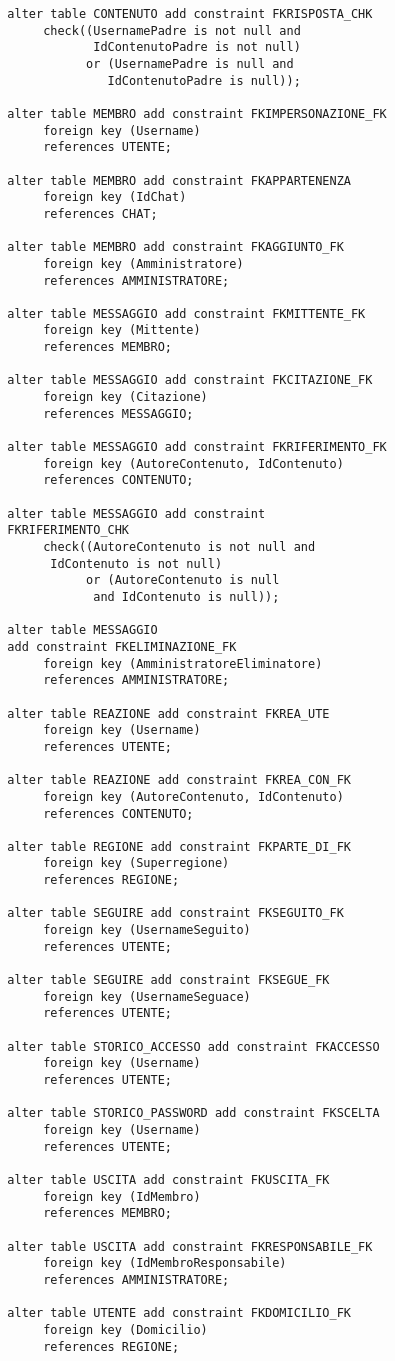 \documentclass[a4paper,12pt]{report}
\begin{document}
\begin{lstlisting}
  alter table CONTENUTO add constraint FKRISPOSTA_CHK
       check((UsernamePadre is not null and 
              IdContenutoPadre is not null)
             or (UsernamePadre is null and
                IdContenutoPadre is null)); 
  
  alter table MEMBRO add constraint FKIMPERSONAZIONE_FK
       foreign key (Username)
       references UTENTE;
  
  alter table MEMBRO add constraint FKAPPARTENENZA
       foreign key (IdChat)
       references CHAT;
  
  alter table MEMBRO add constraint FKAGGIUNTO_FK
       foreign key (Amministratore)
       references AMMINISTRATORE;
  
  alter table MESSAGGIO add constraint FKMITTENTE_FK
       foreign key (Mittente)
       references MEMBRO;
  
  alter table MESSAGGIO add constraint FKCITAZIONE_FK
       foreign key (Citazione)
       references MESSAGGIO;
  
  alter table MESSAGGIO add constraint FKRIFERIMENTO_FK
       foreign key (AutoreContenuto, IdContenuto)
       references CONTENUTO;
  
  alter table MESSAGGIO add constraint 
  FKRIFERIMENTO_CHK
       check((AutoreContenuto is not null and
        IdContenuto is not null)
             or (AutoreContenuto is null
              and IdContenuto is null)); 
  
  alter table MESSAGGIO 
  add constraint FKELIMINAZIONE_FK
       foreign key (AmministratoreEliminatore)
       references AMMINISTRATORE;
  
  alter table REAZIONE add constraint FKREA_UTE
       foreign key (Username)
       references UTENTE;
  
  alter table REAZIONE add constraint FKREA_CON_FK
       foreign key (AutoreContenuto, IdContenuto)
       references CONTENUTO;
  
  alter table REGIONE add constraint FKPARTE_DI_FK
       foreign key (Superregione)
       references REGIONE;
  
  alter table SEGUIRE add constraint FKSEGUITO_FK
       foreign key (UsernameSeguito)
       references UTENTE;
  
  alter table SEGUIRE add constraint FKSEGUE_FK
       foreign key (UsernameSeguace)
       references UTENTE;
  
  alter table STORICO_ACCESSO add constraint FKACCESSO
       foreign key (Username)
       references UTENTE;
  
  alter table STORICO_PASSWORD add constraint FKSCELTA
       foreign key (Username)
       references UTENTE;
  
  alter table USCITA add constraint FKUSCITA_FK
       foreign key (IdMembro)
       references MEMBRO;
  
  alter table USCITA add constraint FKRESPONSABILE_FK
       foreign key (IdMembroResponsabile)
       references AMMINISTRATORE;
  
  alter table UTENTE add constraint FKDOMICILIO_FK
       foreign key (Domicilio)
       references REGIONE;
  
  
\end{lstlisting}
\end{document}
